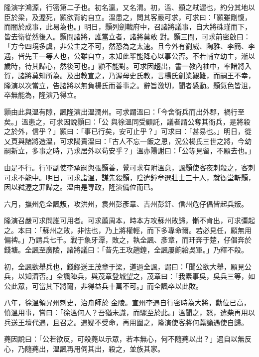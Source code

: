 \begin{pinyinscope}
 隆演字鴻源，行密第二子也。初名瀛，又名渭。初，溫、顥之弒渥也，約分其地以臣於梁，及渥死，顥欲背約自立。溫患之，問其客嚴可求，可求曰：「顥雖剛愎，而闇於成事，此易為也。」明日，顥列劍戟府中，召諸將議事，自大將硃瑾而下，皆去衛從然後入。顥問諸將，誰當立者，諸將莫敢
 對。顥三問，可求前密啟曰：「方今四境多虞，非公主之不可，然恐為之太速。且今外有劉威、陶雅、李簡、李遇，皆先王一等人也，公雖自立，未知此輩能降心以事公否。不若輔立幼主，漸以歲時，待其歸心，然後可也。」顥不能對。可求因趨出，書一教內袖中，率諸將入賀，諸將莫知所為。及出教宣之，乃渥母史氏教，言楊氏創業艱難，而嗣王不幸，隆演以次當立，告諸將以無負楊氏而善事之。辭旨激切，聞者感動。顥氣色皆沮，卒無能為，隆演乃得立。



 顥由此與溫有隙，諷隆演出溫潤州。可求謂溫曰：「今舍衙兵而出外郡，禍行至矣。」溫患之，可求因說顥曰：「公
 與徐溫同受顧託，議者謂公奪其衙兵，是將殺之於外，信乎？」顥曰：「事已行矣，安可止乎？」可求曰：「甚易也。」明日，從乂頁與諸將造溫，可求陽責溫曰：「古人不忘一飯之恩，況公楊氏三世之將，今幼嗣新立，多事之時，乃求居外以茍安乎？」溫亦陽謝曰：「公等見留，不願去也。」



 由是不行。行軍副使李承嗣與張顥善，覺可求有附溫意，諷顥使客夜刺殺之，客刺可求不能中。明日，可求詣溫，謀先殺顥，陰遣鐘章選壯士三十人，就衙堂斬顥，因以弒渥之罪歸之。溫由是專政，隆演備位而已。



 六月，撫州危全諷叛，攻洪州，袁州彭彥章、吉州彭釬、信州危仔倡皆起兵叛。



 隆演召嚴可求問誰可用者。可求薦周本，時本方攻蘇州敗歸，慚不肯出，可求彊起之。本曰：「蘇州之敗，非怯也，乃上將權輕，而下多專命爾。若必見任，願無用偏裨。」乃請兵七千。戰于象牙潭，敗之，執全諷、彥章，而玕奔于楚，仔倡奔於錢塘。全諷至廣陵，諸將議曰：「昔先王攻趙鍠，全諷屢餉給吳軍。」乃釋不殺。



 初，全諷欲舉兵也，錢鏐送王茂章于梁，道過全諷，謂曰：「聞公欲大舉，願見公兵，以知濟否。」全諷陣兵，與茂章登城望之，茂章曰：「我素事吳，吳兵三等，如公此眾，可當其下將爾，非得益兵十萬不可。」而全諷卒以此敗。



 八年，徐溫領昇州刺史，治舟師於
 金陵。宣州李遇自行密時為大將，勳位已高，憤溫用事，嘗曰：「徐溫何人？吾猶未識，而驟至於此。」溫聞之，怒，遣柴再用以兵送王壇代遇，且召之。遇疑不受命，再用圍之，隆演使客將何蕘諭遇使自歸。



 蕘因說曰：「公若欲反，可殺蕘以示眾，若本無心，何不隨蕘以出？」遇自以無反心，乃隨蕘出，溫諷再用伺其出，殺之，並族其家。




\end{pinyinscope}
